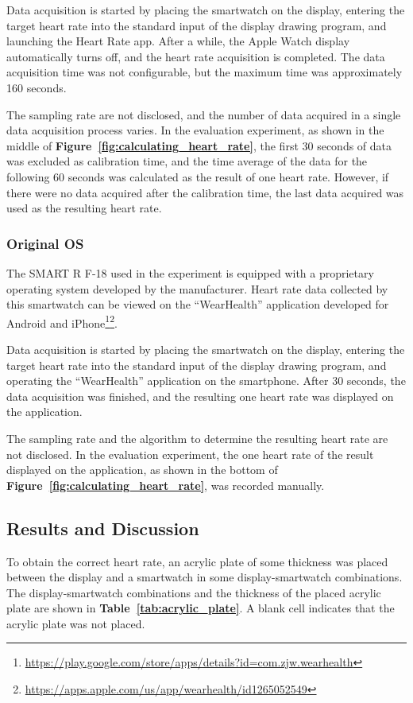\documentclass[sigchi,authordraft]{acmart}
\newcommand\figref[1]{\textbf{Figure~\ref{fig:#1}}}
\newcommand\tabref[1]{\textbf{Table~\ref{tab:#1}}}
\begin{document}
Data acquisition is started by placing the smartwatch on the display, entering the target heart rate into the standard input of the display drawing program, and launching the Heart Rate app. After a while, the Apple Watch display automatically turns off, and the heart rate acquisition is completed. The data acquisition time was not configurable, but the maximum time was approximately 160 seconds.\par

The sampling rate are not disclosed, and the number of data acquired in a single data acquisition process varies. In the evaluation experiment, as shown in the middle of \figref{calculating_heart_rate}, the first 30 seconds of data was excluded as calibration time, and the time average of the data for the following 60 seconds was calculated as the result of one heart rate. However, if there were no data acquired after the calibration time, the last data acquired was used as the resulting heart rate.

\subsubsection{Original OS}
\label{subsec:original}
The SMART R F-18 used in the experiment is equipped with a proprietary operating system developed by the manufacturer. Heart rate data collected by this smartwatch can be viewed on the ``WearHealth'' application developed for Android and iPhone\footnote{\url{https://play.google.com/store/apps/details?id=com.zjw.wearhealth}}\footnote{\url{https://apps.apple.com/us/app/wearhealth/id1265052549}}.\par

Data acquisition is started by placing the smartwatch on the display, entering the target heart rate into the standard input of the display drawing program, and operating the ``WearHealth'' application on the smartphone. After 30 seconds, the data acquisition was finished, and the resulting one heart rate was displayed on the application.\par

The sampling rate and the algorithm to determine the resulting heart rate are not disclosed. In the evaluation experiment, the one heart rate of the result displayed on the application, as shown in the bottom of \figref{calculating_heart_rate}, was recorded manually.


\subsection{Results and Discussion}
To obtain the correct heart rate, an acrylic plate of some thickness was placed between the display and a smartwatch in some display-smartwatch combinations. The display-smartwatch combinations and the thickness of the placed acrylic plate are shown in \tabref{acrylic_plate}. A blank cell indicates that the acrylic plate was not placed.\par
\end{document}
